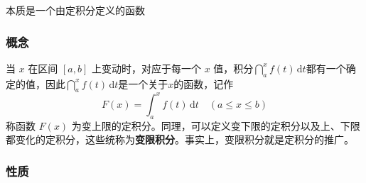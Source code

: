 \documentclass[../book.tex]{subfiles}
\begin{document}
    本质是一个由定积分定义的函数

    \subsubsection{概念}

    当 $x$ 在区间 $[a,b]$ 上变动时，对应于每一个 $x$ 值，积分$\dint_a^x f(t)\,\mathrm{d}t$都有一个确定的值，因此$\dint_a^x f(t)\,\mathrm{d}t$是一个关于$x$的函数，记作
    \[
        F(x)=\int_a^x f(t)\,\mathrm{d}t \quad (a \le x \le b)
    \]
    称函数 $F(x)$ 为变上限的定积分。同理，可以定义变下限的定积分以及上、下限都变化的定积分，这些统称为\textbf{变限积分}。事实上，变限积分就是定积分的推广。

    \subsubsection{性质}
\end{document}
